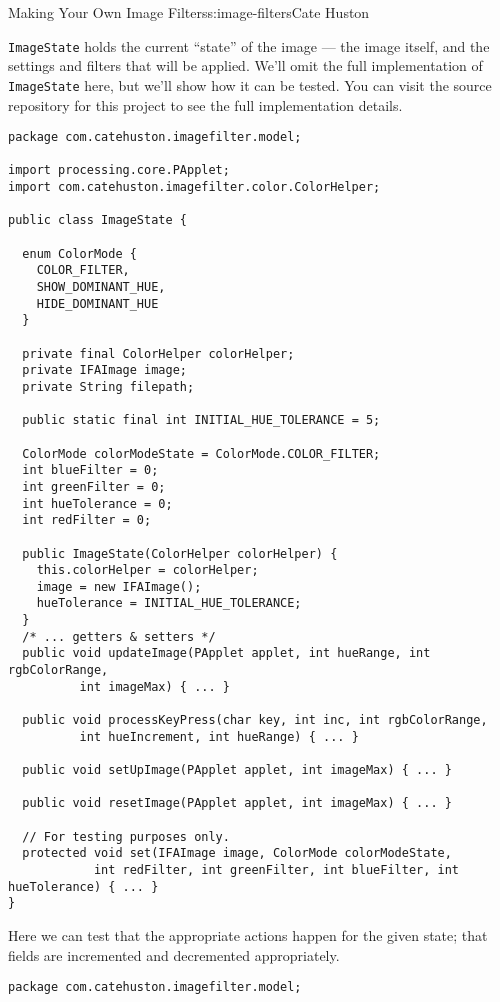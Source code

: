 \begin{aosachapter}{Making Your Own Image Filters}{s:image-filters}{Cate Huston}
\label{image-state-and-associated-tests}

\texttt{ImageState} holds the current ``state'' of the image --- the
image itself, and the settings and filters that will be applied. We'll
omit the full implementation of \texttt{ImageState} here, but we'll show
how it can be tested. You can visit the source repository for this
project to see the full implementation details.

\begin{verbatim}
package com.catehuston.imagefilter.model;

import processing.core.PApplet;
import com.catehuston.imagefilter.color.ColorHelper;

public class ImageState {

  enum ColorMode {
    COLOR_FILTER,
    SHOW_DOMINANT_HUE,
    HIDE_DOMINANT_HUE
  }

  private final ColorHelper colorHelper;
  private IFAImage image;
  private String filepath;

  public static final int INITIAL_HUE_TOLERANCE = 5;

  ColorMode colorModeState = ColorMode.COLOR_FILTER;
  int blueFilter = 0;
  int greenFilter = 0;
  int hueTolerance = 0;
  int redFilter = 0;

  public ImageState(ColorHelper colorHelper) {
    this.colorHelper = colorHelper;
    image = new IFAImage();
    hueTolerance = INITIAL_HUE_TOLERANCE;
  }
  /* ... getters & setters */
  public void updateImage(PApplet applet, int hueRange, int rgbColorRange, 
          int imageMax) { ... }

  public void processKeyPress(char key, int inc, int rgbColorRange,
          int hueIncrement, int hueRange) { ... }

  public void setUpImage(PApplet applet, int imageMax) { ... }

  public void resetImage(PApplet applet, int imageMax) { ... }

  // For testing purposes only.
  protected void set(IFAImage image, ColorMode colorModeState,
            int redFilter, int greenFilter, int blueFilter, int hueTolerance) { ... }
}
\end{verbatim}

Here we can test that the appropriate actions happen for the given
state; that fields are incremented and decremented appropriately.

\begin{verbatim}
package com.catehuston.imagefilter.model;


\end{verbatim}
\end{aosachapter}
